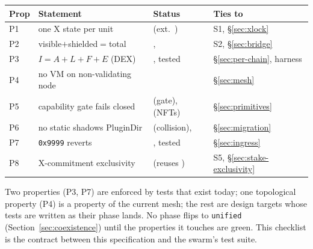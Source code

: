 \begin{center}
\begin{tabular}{@{}llll@{}}
\toprule
Prop & Statement & Status & Ties to \\
\midrule
P1 & one X state per unit         & \DESIGN{} (ext.\ \IMPL{})        & S1, §\ref{sec:xlock} \\
P2 & visible$+$shielded$=$total   & \DESIGN{}, \CRYPTO{}             & S2, §\ref{sec:bridge} \\
P3 & $I{=}A{+}L{+}F{+}E$ (DEX)     & \IMPL{}, tested                  & §\ref{sec:per-chain}, harness \\
P4 & no VM on non-validating node & \IMPL{}                          & §\ref{sec:mesh} \\
P5 & capability gate fails closed & \DESIGN{} (gate), \IMPL{} (NFTs) & §\ref{sec:primitives} \\
P6 & no static shadows PluginDir  & \IMPL{} (collision), \DESIGN{}   & §\ref{sec:migration} \\
P7 & \texttt{0x9999} reverts       & \IMPL{}, tested                  & §\ref{sec:ingress} \\
P8 & X-commitment exclusivity     & \DESIGN{} (reuses \IMPL{})        & S5, §\ref{sec:stake-exclusivity} \\
\bottomrule
\end{tabular}
\end{center}

\noindent Two properties (P3, P7) are enforced by tests that exist
today; one topological property (P4) is a property of the current
mesh; the rest are design targets whose tests are written as their
phase lands. No phase flips to \texttt{unified}
(Section~\ref{sec:coexistence}) until the properties it touches are
green. This checklist is the contract between this specification and the
swarm's test suite.

